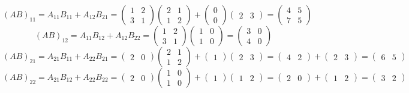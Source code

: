 \documentclass[12pt,a3paper]{article}
\begin{document}
\begin{tcolorbox}
\[
(AB)_{11} = A_{11}B_{11}+A_{12}B_{21}
= \begin{pmatrix}1&2\\3&1\end{pmatrix}\begin{pmatrix}2&1\\1&2\end{pmatrix}+\begin{pmatrix}0\\0\end{pmatrix}\begin{pmatrix}2&3\end{pmatrix}
= \begin{pmatrix}4&5\\7&5\end{pmatrix}
\]
\[
(AB)_{12} = A_{11}B_{12}+A_{12}B_{22}
= \begin{pmatrix}1&2\\3&1\end{pmatrix}\begin{pmatrix}1&0\\1&0\end{pmatrix}
= \begin{pmatrix}3&0\\4&0\end{pmatrix}
\]
\[
(AB)_{21} = A_{21}B_{11}+A_{22}B_{21}
= \begin{pmatrix}2&0\end{pmatrix}\begin{pmatrix}2&1\\1&2\end{pmatrix}+\begin{pmatrix}1\end{pmatrix}\begin{pmatrix}2&3\end{pmatrix}
= \begin{pmatrix}4&2\end{pmatrix}+\begin{pmatrix}2&3\end{pmatrix}=\begin{pmatrix}6&5\end{pmatrix}
\]
\[
(AB)_{22} = A_{21}B_{12}+A_{22}B_{22}
= \begin{pmatrix}2&0\end{pmatrix}\begin{pmatrix}1&0\\1&0\end{pmatrix}+\begin{pmatrix}1\end{pmatrix}\begin{pmatrix}1&2\end{pmatrix}
= \begin{pmatrix}2&0\end{pmatrix}+\begin{pmatrix}1&2\end{pmatrix}=\begin{pmatrix}3&2\end{pmatrix}
\]
 

\end{tcolorbox}
\end{document}
